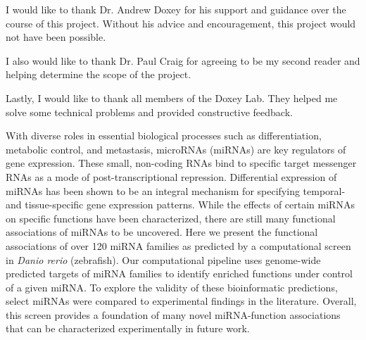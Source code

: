 \documentclass[12pt]{article}
\begin{document}


I would like to thank Dr. Andrew Doxey for his support and guidance over the course of this project. Without his advice and encouragement, this project would not have been possible.

I also would like to thank Dr. Paul Craig for agreeing to be my second reader and helping determine the scope of the project.

Lastly, I would like to thank all members of the Doxey Lab. They helped me solve some technical problems and provided constructive feedback.

\newpage

With diverse roles in essential biological processes such as differentiation, metabolic control, and metastasis, microRNAs (miRNAs) are key regulators of gene expression. These small, non-coding RNAs bind to specific target messenger RNAs as a mode of post-transcriptional repression. Differential expression of miRNAs has been shown to be an integral mechanism for specifying temporal- and tissue-specific gene expression patterns. While the effects of certain miRNAs on specific functions have been characterized, there are still many functional associations of miRNAs to be uncovered. Here we present the functional associations of over 120 miRNA families as predicted by a computational screen in \textit{Danio rerio} (zebrafish). Our computational pipeline uses genome-wide predicted targets of miRNA families to identify enriched functions under control of a given miRNA. To explore the validity of these bioinformatic predictions, select miRNAs were compared to experimental findings in the literature. Overall, this screen provides a foundation of many novel miRNA-function associations that can be characterized experimentally in future work.
\newpage

\UWtableofcontents

\ifoot[]{}
\cfoot[]{}
\ofoot[\pagemark]{\pagemark}
\pagestyle{scrplain}
\end{document}
